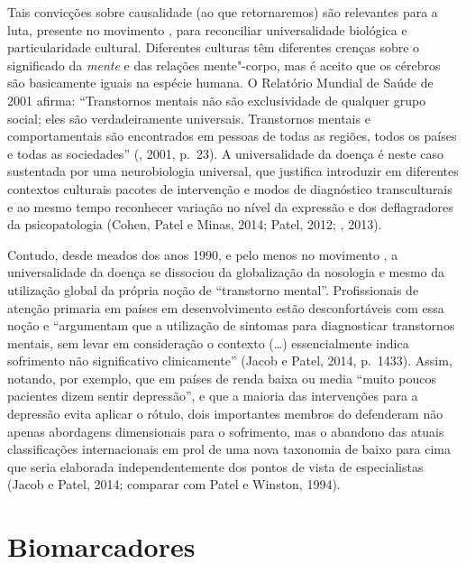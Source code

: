 Tais convicções sobre causalidade (ao que retornaremos) são relevantes
para a luta, presente no movimento , para reconciliar universalidade
biológica e particularidade cultural. Diferentes culturas têm diferentes
crenças sobre o significado da \emph{mente} e das relações mente"-corpo,
mas é aceito que os cérebros são basicamente iguais na espécie humana. O
Relatório Mundial de Saúde de 2001 afirma: ``Transtornos mentais não são
exclusividade de qualquer grupo social; eles são verdadeiramente
universais. Transtornos mentais e comportamentais são encontrados em
pessoas de todas as regiões, todos os países e todas as sociedades''
(, 2001, p.~23). A universalidade da doença é neste caso sustentada
por uma neurobiologia universal, que justifica introduzir em diferentes
contextos culturais pacotes de intervenção e modos de diagnóstico
transculturais e ao mesmo tempo reconhecer variação no nível da
expressão e dos deflagradores da psicopatologia (Cohen, Patel e Minas,
2014; Patel, 2012; , 2013).

Contudo, desde meados dos anos 1990, e pelo menos no movimento , a
universalidade da doença se dissociou da globalização da nosologia e
mesmo da utilização global da própria noção de ``transtorno mental''.
Profissionais de atenção primaria em países em desenvolvimento estão
desconfortáveis com essa noção e ``argumentam que a utilização de
sintomas para diagnosticar transtornos mentais, sem levar em
consideração o contexto (\ldots{}) essencialmente indica sofrimento não
significativo clinicamente'' (Jacob e Patel, 2014, p.~1433). Assim,
notando, por exemplo, que em países de renda baixa ou media ``muito
poucos pacientes dizem sentir depressão'', e que a maioria das
intervenções para a depressão evita aplicar o rótulo, dois importantes
membros do  defenderam não apenas abordagens dimensionais para o
sofrimento, mas o abandono das atuais classificações internacionais em
prol de uma nova taxonomia de baixo para cima que seria elaborada
independentemente dos pontos de vista de especialistas (Jacob e Patel,
2014; comparar com Patel e Winston, 1994).

\section{Biomarcadores}

